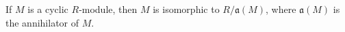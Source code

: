 If $M$ is a cyclic $R$-module, then $M$ is isomorphic to $R/\mathfrak{a}(M)$, where $\mathfrak{a}(M)$ is the annihilator of $M$.
